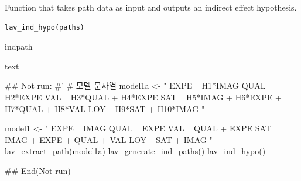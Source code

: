 \documentclass[a4paper]{book}
\begin{document}
%
\begin{Description}
Function that takes path data as input and outputs an indirect effect hypothesis.
\end{Description}
%
\begin{Usage}
\begin{verbatim}
lav_ind_hypo(paths)
\end{verbatim}
\end{Usage}
%
\begin{Arguments}
\begin{ldescription}
\item[\code{paths}] indpath
\end{ldescription}
\end{Arguments}
%
\begin{Value}
text
\end{Value}
%
\begin{Examples}
\begin{ExampleCode}

\#\# Not run: 
#'
# 모델 문자열
model1a <- "
EXPE ~ H1*IMAG
QUAL ~ H2*EXPE
VAL ~ H3*QUAL + H4*EXPE
SAT ~ H5*IMAG + H6*EXPE + H7*QUAL + H8*VAL
LOY ~ H9*SAT + H10*IMAG
"

model1 <- "
EXPE ~ IMAG
QUAL ~ EXPE
VAL ~ QUAL + EXPE
SAT ~ IMAG + EXPE + QUAL + VAL
LOY ~ SAT + IMAG
"
lav_extract_path(model1a)%
  lav_generate_ind_paths() %
  lav_ind_hypo()


## End(Not run)

\end{ExampleCode}
\end{Examples}
\end{document}
